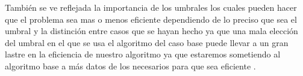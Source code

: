 \documentclass[11pt,openany]{book}
\begin{document}
También se ve reflejada la importancia de los umbrales los cuales pueden hacer que el problema sea mas o menos eficiente 
dependiendo de lo preciso que sea el umbral y la distinción entre casos que se hayan  hecho ya que una mala elección 
del umbral en el que se usa el algoritmo del caso base puede llevar a un gran lastre en la eficiencia de nuestro algoritmo 
ya que estaremos sometiendo al algoritmo  base a más datos de los necesarios para que sea eficiente .
\end{document}
